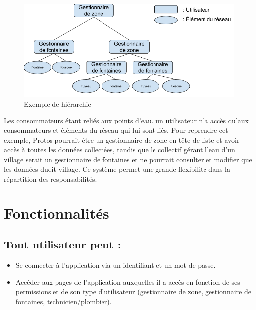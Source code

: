 \documentclass[a4paper, 11pt]{article}
\begin{document}
    \begin{figure}[H]
      \centering
      \includegraphics[width=.8\textwidth]{Cahier_des_Charges/principe_hierarchique}
      \caption{Exemple de hiérarchie}
      \label{fig:hierarchie}
    \end{figure}

    Les consommateurs étant reliés aux points d'eau, un utilisateur n'a accès qu'aux consommateurs et éléments du réseau qui lui sont liés. Pour reprendre cet exemple, Protos pourrait être un gestionnaire de zone en tête de liste et avoir accès à toutes les données collectées, tandis que le collectif gérant l'eau d'un village serait un gestionnaire de fontaines et ne pourrait consulter et modifier que les données dudit village. Ce système permet une grande flexibilité dans la répartition des responsabilités.
\section{Fonctionnalités}

\subsection{Tout utilisateur peut :}
\begin{itemize}
  \item Se connecter à l'application via un identifiant et un mot de passe.
  \item Accéder aux pages de l'application auxquelles il a accès en fonction de ses permissions et de son type d'utilisateur (gestionnaire de zone, gestionnaire de fontaines, technicien/plombier).
\end{itemize}
\end{document}

